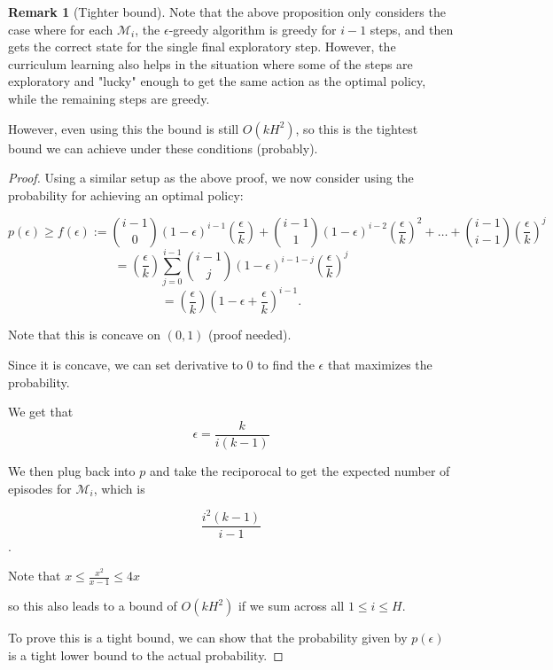 \documentclass[12pt, letterpaper]{article}
\theoremstyle{definition}
\newtheorem*{rmk}{Remark}
\theoremstyle{remark}
\begin{document}
\begin{rmk}[Tighter bound]
    Note that the above proposition only considers the case where for each \(\mathcal{M}_i\), the \(\epsilon\)-greedy algorithm is greedy for \(i-1\) steps, and then gets the correct state for the single final exploratory step. However, the curriculum learning also helps in the situation where some of the steps are exploratory and "lucky" enough to get the same action as the optimal policy, while the remaining steps are greedy.

    However, even using this the bound is still $O(kH^2)$, so this is the tightest bound we can achieve under these conditions (probably).
\end{rmk}

\begin{proof}[Proof]
    Using a similar setup as the above proof, we now consider using the probability for achieving an optimal policy:

    \[p(\epsilon) \geq f(\epsilon) := {i-1 \choose 0} (1-\epsilon)^{i-1}(\frac{\epsilon}{k}) + {i-1 \choose 1}(1-\epsilon)^{i-2}(\frac{\epsilon}{k})^2 + \ldots + {i-1 \choose i-1} (\frac{\epsilon}{k})^j\]
    \[= (\frac{\epsilon}{k})\sum_{j=0}^{i-1}{i-1 \choose j} (1-\epsilon)^{i-1-j}(\frac{\epsilon}{k})^{j}\]
    \[= (\frac{\epsilon}{k})(1-\epsilon + \frac{\epsilon}{k})^{i-1}.\]

    Note that this is concave on \((0, 1)\) (proof needed).

    Since it is concave, we can set derivative to 0 to find the \(\epsilon\) that maximizes the probability.

    We get that
    \[\epsilon = \frac{k}{i(k-1)}\]

    We then plug back into \(p\) and take the reciporocal to get the expected number of episodes for \(\mathcal{M}_i\), which is

    \[\frac{i^2(k-1)}{i-1}\].

    Note that \(x \leq \frac{x^2}{x-1} \leq 4x\)

    so this also leads to a bound of \(O(kH^2)\) if we sum across all \(1 \leq i \leq H\).

    To prove this is a tight bound, we can show that the probability given by \(p(\epsilon)\) is a tight lower bound to the actual probability.
\end{proof}
\end{document}
